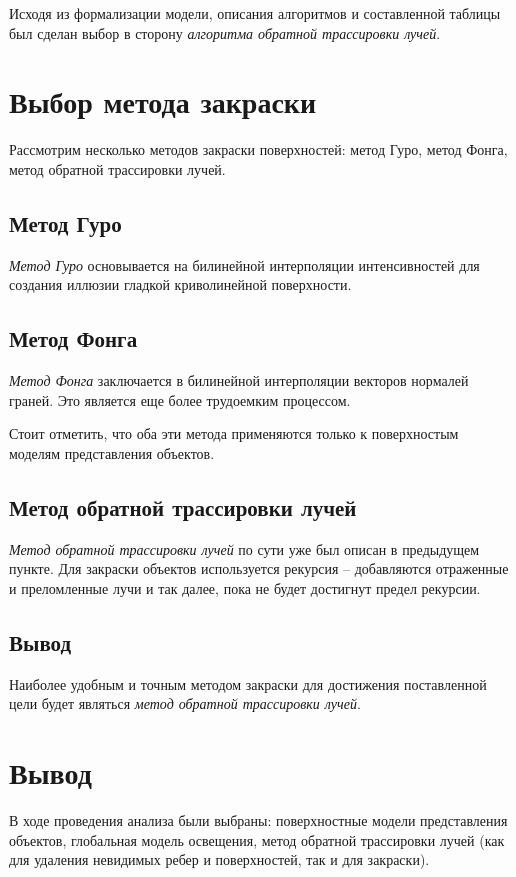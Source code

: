 \indent Исходя из формализации модели, описания алгоритмов и составленной таблицы был сделан выбор в сторону \emph{алгоритма обратной трассировки лучей}.

\section{Выбор метода закраски}

Рассмотрим несколько методов закраски поверхностей: метод Гуро, метод Фонга, метод обратной трассировки лучей. \cite{colormethods}

\subsection{Метод Гуро}

\emph{Метод Гуро} основывается на билинейной интерполяции интенсивностей для создания иллюзии гладкой криволинейной поверхности.

\subsection{Метод Фонга}

\emph{Метод Фонга} заключается в билинейной интерполяции векторов нормалей граней. Это является еще более трудоемким процессом.

Стоит отметить, что оба эти метода применяются только к поверхностым моделям представления объектов.

\subsection{Метод обратной трассировки лучей}

\emph{Метод обратной трассировки лучей} по сути уже был описан в предыдущем пункте.
Для закраски объектов используется рекурсия -- добавляются отраженные и преломленные лучи и так далее, пока не будет достигнут предел рекурсии.

\subsection{Вывод}

Наиболее удобным и точным методом закраски для достижения поставленной цели будет являться \emph{метод обратной трассировки лучей}.

\section*{Вывод}
{}

В ходе проведения анализа были выбраны: поверхностные модели представления объектов, глобальная модель освещения, метод обратной трассировки лучей (как для удаления невидимых ребер и поверхностей, так и для закраски).
